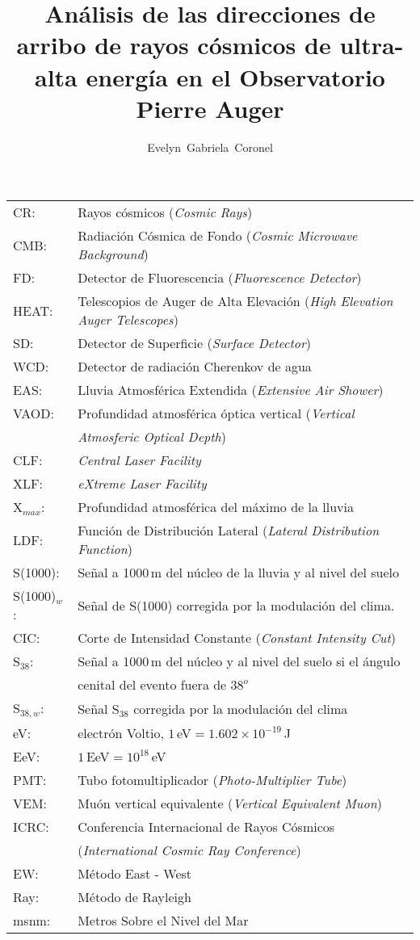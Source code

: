 \documentclass[12pt,papel,twoside,pagebackref]{ibtesis}
\title{Análisis de las direcciones de arribo de rayos cósmicos de ultra-alta energía en el Observatorio Pierre Auger}
\author{Evelyn~Gabriela~Coronel}
\begin{document}
\begin{preliminary}


\begin{abreviaturas}

\begin{tabular}{l l}
CR: 		& Rayos cósmicos  (\emph{Cosmic Rays}) \\
CMB: 		& Radiación Cósmica de Fondo (\emph{Cosmic Microwave Background})\\
FD: 		& Detector de Fluorescencia (\emph{Fluorescence Detector}) \\
HEAT:		& Telescopios de Auger de Alta Elevación (\emph{High Elevation Auger Telescopes})\\
SD: 		& Detector de Superficie (\emph{Surface Detector})  \\
WCD: 		& Detector de radiación Cherenkov de agua\\
EAS: 		& Lluvia Atmosférica Extendida  (\emph{Extensive Air Shower})    \\
VAOD: 		& Profundidad atmosférica óptica vertical (\emph{Vertical} \\
			& \emph{Atmosferic Optical Depth})\\
CLF:		& \emph{Central Laser Facility}\\
XLF:		& \emph{eXtreme Laser Facility}\\
X$_{max}$: 	& Profundidad atmosférica del máximo de la lluvia \\
LDF: 		& Función de Distribución Lateral (\emph{Lateral Distribution Function}) \\
S(1000): 	& Señal a 1000\,m del núcleo de la lluvia y al nivel del suelo \\
S(1000)$_w$:& Señal de S(1000) corregida por la modulación del clima. \\
CIC: 		& Corte de Intensidad Constante (\emph{Constant Intensity Cut}) \\
S$_{38}$: 	& Señal a 1000\,m del núcleo y al nivel del suelo si el ángulo\\
			& cenital del evento fuera de $38^o$\\
S$_{38,w}$: & Señal S$_{38}$ corregida por la modulación del clima \\
eV: 		& electrón Voltio, $1\,$eV$= 1.602\times 10^{-19}\,$J \\
EeV: 		& $1\,$EeV$=10^{18}\,$eV\\
PMT: 		& Tubo fotomultiplicador (\emph{Photo-Multiplier Tube})\\
VEM: 		& Muón vertical equivalente (\emph{Vertical Equivalent Muon})\\
ICRC: 		& Conferencia Internacional de Rayos Cósmicos \\
			& (\emph{International Cosmic Ray Conference})\\
EW:			& Método East - West\\
Ray:		& Método de Rayleigh\\
msnm:		& Metros Sobre el Nivel del Mar\\
\end{tabular}
\end{abreviaturas}


\end{preliminary}
\end{document}
